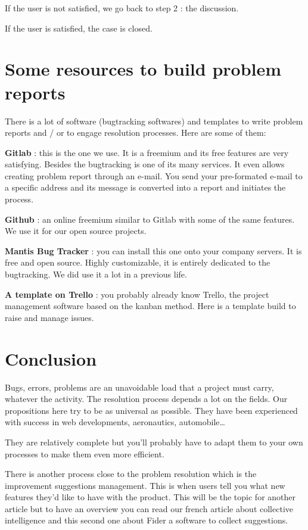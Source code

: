 If the user is not satisfied, we go back to step 2 : the discussion.

If the user is satisfied, the case is closed.

\section{Some resources to build problem reports}
There is a lot of software (bugtracking softwares) and templates to write problem reports and / or to engage resolution processes. Here are some of them:

\textbf{Gitlab} : this is the one we use. It is a freemium and its free features are very satisfying. Besides the bugtracking is one of its many services. It even allows creating problem report through an e-mail. You send your pre-formated e-mail to a specific address and its message is converted into a report and initiates the process.

\textbf{Github} : an online freemium similar to Gitlab with some of the same features. We use it for our open source projects.

\textbf{Mantis Bug Tracker} : you can install this one onto your company servers. It is free and open source. Highly customizable, it is entirely dedicated to the bugtracking. We did use it a lot in a previous life.

\textbf{A template on Trello} : you probably already know Trello, the project management software based on the kanban method. Here is a template build to raise and manage issues.

\section{Conclusion}
Bugs, errors, problems are an unavoidable load that a project must carry, whatever the activity. The resolution process depends a lot on the fields. Our propositions here try to be as universal as possible. They have been experienced with success in web developments, aeronautics, automobile…

They are relatively complete but you’ll probably have to adapt them to your own processes to make them even more efficient.

There is another process close to the problem resolution which is the improvement suggestions management. This is when users tell you what new features they’d like to have with the product. This will be the topic for another article but to have an overview you can read our french article about collective intelligence and this second one about Fider a software to collect suggestions.